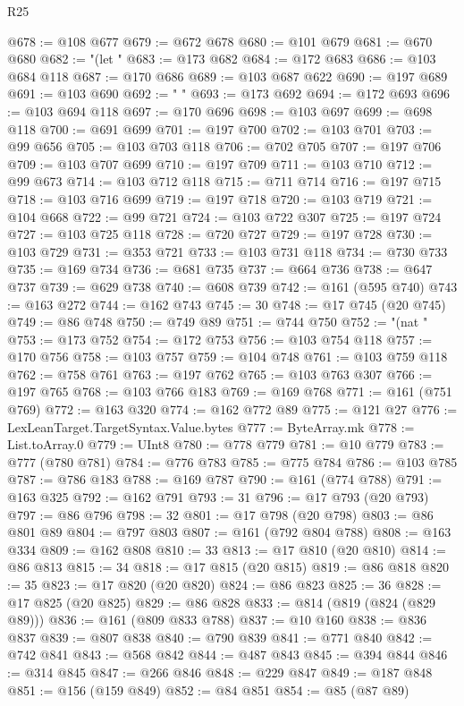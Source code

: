 \begin{lexlean}{R25}
\begin{coremodule}
@678 := @108 @677
@679 := @672 @678
@680 := @101 @679
@681 := @670 @680
@682 := "(let "
@683 := @173 @682
@684 := @172 @683
@686 := @103 @684 @118
@687 := @170 @686
@689 := @103 @687 @622
@690 := @197 @689
@691 := @103 @690
@692 := " "
@693 := @173 @692
@694 := @172 @693
@696 := @103 @694 @118
@697 := @170 @696
@698 := @103 @697
@699 := @698 @118
@700 := @691 @699
@701 := @197 @700
@702 := @103 @701
@703 := @99 @656
@705 := @103 @703 @118
@706 := @702 @705
@707 := @197 @706
@709 := @103 @707 @699
@710 := @197 @709
@711 := @103 @710
@712 := @99 @673
@714 := @103 @712 @118
@715 := @711 @714
@716 := @197 @715
@718 := @103 @716 @699
@719 := @197 @718
@720 := @103 @719
@721 := @104 @668
@722 := @99 @721
@724 := @103 @722 @307
@725 := @197 @724
@727 := @103 @725 @118
@728 := @720 @727
@729 := @197 @728
@730 := @103 @729
@731 := @353 @721
@733 := @103 @731 @118
@734 := @730 @733
@735 := @169 @734
@736 := @681 @735
@737 := @664 @736
@738 := @647 @737
@739 := @629 @738
@740 := @608 @739
@742 := @161 (@595 @740)
@743 := @163 @272
@744 := @162 @743
@745 := 30
@748 := @17 @745 (@20 @745)
@749 := @86 @748
@750 := @749 @89
@751 := @744 @750
@752 := "(nat "
@753 := @173 @752
@754 := @172 @753
@756 := @103 @754 @118
@757 := @170 @756
@758 := @103 @757
@759 := @104 @748
@761 := @103 @759 @118
@762 := @758 @761
@763 := @197 @762
@765 := @103 @763 @307
@766 := @197 @765
@768 := @103 @766 @183
@769 := @169 @768
@771 := @161 (@751 @769)
@772 := @163 @320
@774 := @162 @772 @89
@775 := @121 @27
@776 := LexLeanTarget.TargetSyntax.Value.bytes
@777 := ByteArray.mk
@778 := List.toArray.{0}
@779 := UInt8
@780 := @778 @779
@781 := @10 @779
@783 := @777 (@780 @781)
@784 := @776 @783
@785 := @775 @784
@786 := @103 @785
@787 := @786 @183
@788 := @169 @787
@790 := @161 (@774 @788)
@791 := @163 @325
@792 := @162 @791
@793 := 31
@796 := @17 @793 (@20 @793)
@797 := @86 @796
@798 := 32
@801 := @17 @798 (@20 @798)
@803 := @86 @801 @89
@804 := @797 @803
@807 := @161 (@792 @804 @788)
@808 := @163 @334
@809 := @162 @808
@810 := 33
@813 := @17 @810 (@20 @810)
@814 := @86 @813
@815 := 34
@818 := @17 @815 (@20 @815)
@819 := @86 @818
@820 := 35
@823 := @17 @820 (@20 @820)
@824 := @86 @823
@825 := 36
@828 := @17 @825 (@20 @825)
@829 := @86 @828
@833 := @814 (@819 (@824 (@829 @89)))
@836 := @161 (@809 @833 @788)
@837 := @10 @160
@838 := @836 @837
@839 := @807 @838
@840 := @790 @839
@841 := @771 @840
@842 := @742 @841
@843 := @568 @842
@844 := @487 @843
@845 := @394 @844
@846 := @314 @845
@847 := @266 @846
@848 := @229 @847
@849 := @187 @848
@851 := @156 (@159 @849)
@852 := @84 @851
@854 := @85 (@87 @89)

\end{coremodule}
\end{lexlean}
